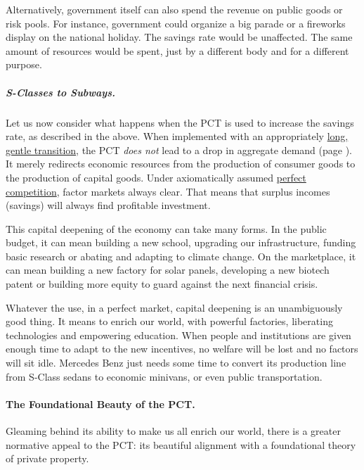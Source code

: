 Alternatively, government itself can also spend the revenue on public goods or risk pools.
For instance, government could organize a big parade or a fireworks display on the national holiday.
The savings rate would be unaffected.
The same amount of resources would be spent, just by a different body and for a different purpose.

\subparagraph{S-Classes to Subways.}
Let us now consider what happens when the PCT is used to increase the savings rate, as described in the above.
When implemented with an appropriately \hyperref[sec:GoSlow]{long, gentle transition}, the PCT \emph{does not} lead to a drop in aggregate demand (page \pageref{sec:GoSlow}).
It merely redirects economic resources from the production of consumer goods to the production of capital goods.
Under axiomatically assumed \hyperref[sec:perfect-competition]{perfect competition}, factor markets always clear.
That means that surplus incomes (savings) will always find profitable investment.

This capital deepening of the economy can take many forms.
In the public budget, it can mean building a new school, upgrading our infrastructure, funding basic research or abating and adapting to climate change.
On the marketplace, it can mean building a new factory for solar panels, developing a new biotech patent or building more equity to guard against the next financial crisis.

Whatever the use, in a perfect market, capital deepening is an unambiguously good thing.
It means to enrich our world, with powerful
factories, liberating technologies and empowering education.
When people and institutions are given enough time to adapt to the new incentives, no welfare will be lost and no factors will sit idle.
Mercedes Benz just needs some time to convert its production line from S-Class sedans to economic minivans, or even public transportation.


\paragraph{The Foundational Beauty of the PCT.}
	\label{sec:foundational-beauty}
Gleaming behind its ability to make us all enrich our world, there is a greater normative appeal to the PCT:
its beautiful alignment with a foundational theory of private property.

